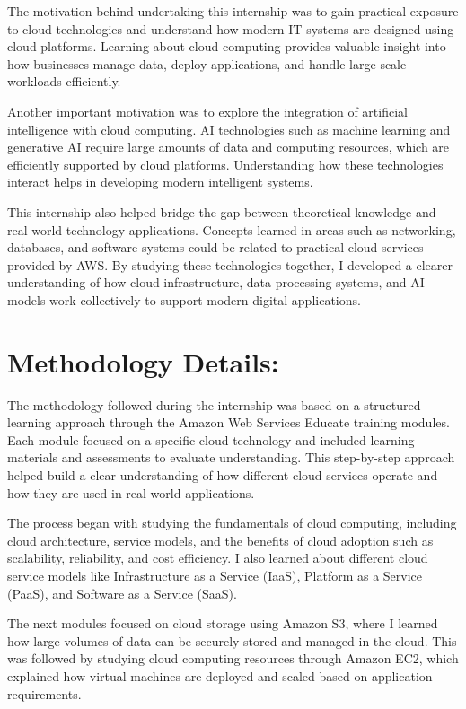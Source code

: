 \documentclass[12pt, a4paper, oneside]{report}
\begin{document}
The motivation behind undertaking this internship was to gain practical exposure to 
cloud technologies and understand how modern IT systems are designed using cloud 
platforms. Learning about cloud computing provides valuable insight into how 
businesses manage data, deploy applications, and handle large-scale workloads 
efficiently.

Another important motivation was to explore the integration of artificial intelligence 
with cloud computing. AI technologies such as machine learning and generative AI 
require large amounts of data and computing resources, which are efficiently supported 
by cloud platforms. Understanding how these technologies interact helps in developing 
modern intelligent systems.

This internship also helped bridge the gap between theoretical knowledge and real-world 
technology applications. Concepts learned in areas such as networking, databases, and 
software systems could be related to practical cloud services provided by AWS. By 
studying these technologies together, I developed a clearer understanding of how cloud 
infrastructure, data processing systems, and AI models work collectively to support 
modern digital applications.
\newpage
\section{Methodology Details:}

The methodology followed during the internship was based on a structured learning 
approach through the Amazon Web Services Educate training modules. Each module 
focused on a specific cloud technology and included learning materials and assessments 
to evaluate understanding. This step-by-step approach helped build a clear 
understanding of how different cloud services operate and how they are used in 
real-world applications.

The process began with studying the fundamentals of cloud computing, including cloud 
architecture, service models, and the benefits of cloud adoption such as scalability, 
reliability, and cost efficiency. I also learned about different cloud service models like 
Infrastructure as a Service (IaaS), Platform as a Service (PaaS), and Software as a 
Service (SaaS).

The next modules focused on cloud storage using Amazon S3, where I learned how 
large volumes of data can be securely stored and managed in the cloud. This was 
followed by studying cloud computing resources through Amazon EC2, which 
explained how virtual machines are deployed and scaled based on application 
requirements.
\end{document}
